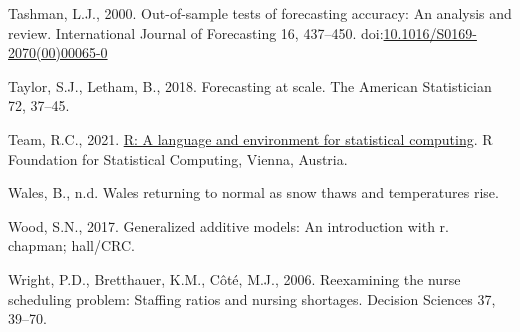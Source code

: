 \documentclass[]{elsarticle} %
\newlength{\cslhangindent}
\newlength{\cslentryspacingunit} %
\newenvironment{CSLReferences}[2] %
 {%
  \setlength{\parindent}{0pt}
  \ifodd #1
  \let\oldpar\par
  \def\par{\hangindent=\cslhangindent\oldpar}
  \fi
  \setlength{\parskip}{#2\cslentryspacingunit}
 }%
 {}
\begin{document}
\begin{CSLReferences}{1}{0}
\leavevmode{}%
Tashman, L.J., 2000. {Out-of-sample tests of forecasting accuracy: An analysis and review}. International Journal of Forecasting 16, 437--450. doi:\href{https://doi.org/10.1016/S0169-2070(00)00065-0}{10.1016/S0169-2070(00)00065-0}

\leavevmode{}%
Taylor, S.J., Letham, B., 2018. Forecasting at scale. The American Statistician 72, 37--45.

\leavevmode{}%
Team, R.C., 2021. \href{https://www.R-project.org/}{R: A language and environment for statistical computing}. R Foundation for Statistical Computing, Vienna, Austria.

\leavevmode{}%
Wales, B., n.d. Wales returning to normal as snow thaws and temperatures rise.

\leavevmode{}%
Wood, S.N., 2017. Generalized additive models: An introduction with r. chapman; hall/CRC.

\leavevmode{}%
Wright, P.D., Bretthauer, K.M., Côté, M.J., 2006. Reexamining the nurse scheduling problem: Staffing ratios and nursing shortages. Decision Sciences 37, 39--70.

\end{CSLReferences}
\end{document}
